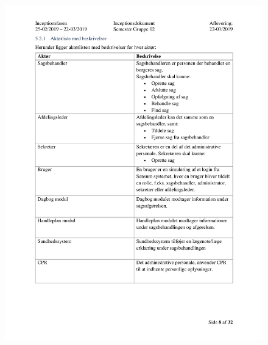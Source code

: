 \begin{figure}[hb]
  \includegraphics[scale = 0.33]{./PNG/Inceptions/Gruppe 02 + InceptionsDokument-09.jpg} 
\end{figure}

